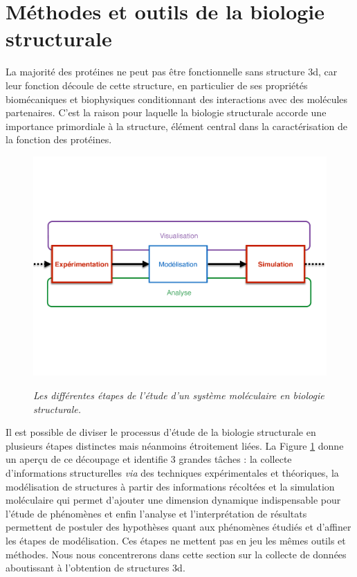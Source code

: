 \section{Méthodes et outils de la biologie structurale}

La majorité des protéines ne peut pas être fonctionnelle sans structure 3d, car leur fonction découle de cette structure, en particulier de ses propriétés biomécaniques et biophysiques conditionnant des interactions avec des molécules partenaires. C'est la raison pour laquelle la biologie structurale accorde une importance primordiale à la structure, élément central dans la caractérisation de la fonction des protéines.

\begin{figure}[h]
  \centering
  {\includegraphics[width=.75\linewidth]{./figures/ch1/process_bio_struct_XP}}
    \caption{{\it Les différentes étapes de l'étude d'un système moléculaire en biologie structurale.}}
  \label{Fig:schema_seq_bio_struct_XP}
  \hspace{0.2cm}
\end{figure}

Il est possible de diviser le processus d'étude de la biologie structurale en plusieurs étapes distinctes mais néanmoins étroitement liées.
La Figure \ref{Fig:schema_seq_bio_struct_XP} donne un aperçu de ce découpage et identifie 3 grandes tâches : la collecte d'informations structurelles \textit{via} des techniques expérimentales et théoriques, la modélisation de structures à partir des informations récoltées et la simulation moléculaire qui permet d'ajouter une dimension dynamique indispensable pour l'étude de phénomènes et enfin l'analyse et l'interprétation de résultats permettent de postuler des hypothèses quant aux phénomènes étudiés et d'affiner les étapes de modélisation.
Ces étapes ne mettent pas en jeu les mêmes outils et méthodes. Nous nous concentrerons dans cette section sur la collecte de données aboutissant à l'obtention de structures 3d.

